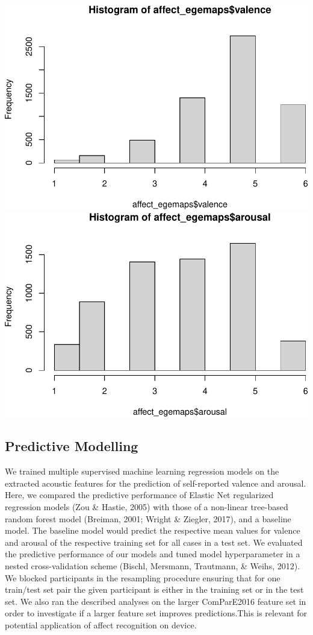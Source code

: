 \documentclass[
  english,
  man,floatsintext]{apa6}
\begin{document}
\includegraphics{AffectExperience_Audio_Manuscript_files/figure-latex/unnamed-chunk-2-1.pdf} \includegraphics{AffectExperience_Audio_Manuscript_files/figure-latex/unnamed-chunk-2-2.pdf}

\hypertarget{predictive-modelling}{%
\subsection{Predictive Modelling}\label{predictive-modelling}}

We trained multiple supervised machine learning regression models on the extracted acoustic features for the prediction of self-reported valence and arousal. Here, we compared the predictive performance of Elastic Net regularized regression models (Zou \& Hastie, 2005) with those of a non-linear tree-based random forest model (Breiman, 2001; Wright \& Ziegler, 2017), and a baseline model. The baseline model would predict the respective mean values for valence and arousal of the respective training set for all cases in a test set. We evaluated the predictive performance of our models and tuned model hyperparameter in a nested cross-validation scheme (Bischl, Mersmann, Trautmann, \& Weihs, 2012). We blocked participants in the resampling procedure ensuring that for one train/test set pair the given participant is either in the training set or in the test set. We also ran the described analyses on the larger ComParE2016 feature set in order to investigate if a larger feature set improves predictions.This is relevant for potential application of affect recognition on device.
\end{document}
